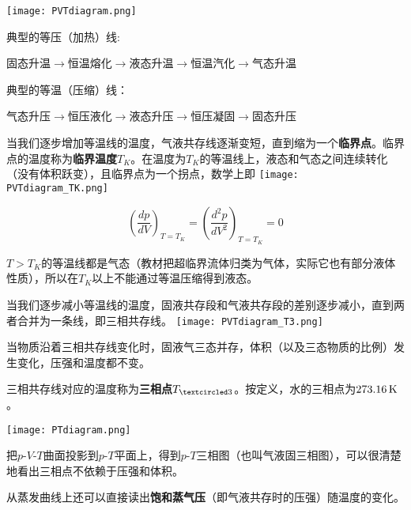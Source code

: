 \documentclass[CJK]{beamer}
\begin{document}
\begin{frame}
\bch
{}
\texttt{[image: PVTdiagram.png]}
\emini
{}
{\small

\bitem
\item{典型的等压（加热）线:

 固态升温$\rightarrow$恒温熔化$\rightarrow$液态升温$\rightarrow$恒温汽化$\rightarrow$气态升温}

\item{典型的等温（压缩）线：

气态升压$\rightarrow$恒压液化$\rightarrow$液态升压$\rightarrow$恒压凝固$\rightarrow$固态升压

}
\eitem
}
\emini
\ech
\end{frame}


\begin{frame}
\bch
\bitem
\item{\small 当我们逐步增加等温线的温度，气液共存线逐渐变短，直到缩为一个{\bf 临界点}。临界点的温度称为{\bf 临界温度$T_K$}。在温度为$T_K$的等温线上，液态和气态之间连续转化（没有体积跃变），且临界点为一个拐点，数学上即}
\eitem
{}
\texttt{[image: PVTdiagram\_TK.png]}
\emini
{}
{\small
$$\left(\frac{d p}{d V}\right)_{T=T_K} = \left(\frac{d^2 p}{d V^2}\right)_{T=T_K} = 0$$ 
\bitem
\item{$T>T_K$的等温线都是气态{\scriptsize（教材把超临界流体归类为气体，实际它也有部分液体性质）}，所以在$T_K$以上不能通过等温压缩得到液态。}
\eitem
}
\emini
\ech
\end{frame}

\begin{frame}
\bch
\bitem
\item{\small 当我们逐步减小等温线的温度，固液共存段和气液共存段的差别逐步减小，直到两者合并为一条线，即三相共存线。}
\eitem
{}
\texttt{[image: PVTdiagram\_T3.png]}
\emini
{}
{\small
\bitem
\item{当物质沿着三相共存线变化时，固液气三态并存，体积（以及三态物质的比例）发生变化，压强和温度都不变。}
\item{三相共存线对应的温度称为{\bf 三相点$\Tthree$}。按定义，水的三相点为$273.16\,\mathrm{K}$。}
\eitem
}
\emini
\ech
\end{frame}

\begin{frame}
\bch
{}
\texttt{[image: PTdiagram.png]}
\emini
{}
{\small
把$p$-$V$-$T$曲面投影到$p$-$T$平面上，得到$p$-$T$三相图（也叫气液固三相图），可以很清楚地看出三相点不依赖于压强和体积。

从蒸发曲线上还可以直接读出{\bf 饱和蒸气压}（即气液共存时的压强）随温度的变化。}
\emini
\ech
\end{frame}
\end{document}
